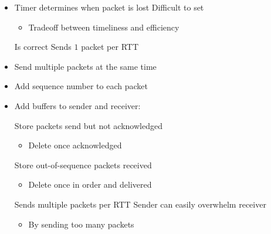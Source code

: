 \begin{itemize}
\begin{itemize}
\begin{verbatim}
\end{verbatim}
            \item Timer determines when packet is lost
             Difficult to set
                \begin{itemize}
                     Unnecessary retransmissions
                     Slow transmission
                        \begin{itemize}
                            \item Long wait for missing packets
                        \end{itemize}
                    \item Tradeoff between timeliness and efficiency
                \end{itemize}
            \ipro Is correct
            \icon Sends $1$ packet per RTT
        \end{itemize}
        \begin{itemize}
             Improve timeliness and efficiency
            \item Send multiple packets at the same time
            \item Add sequence number to each packet
            \item Add buffers to sender and receiver:
                \begin{itemize}
                     Store packets send but not acknowledged
                        \begin{itemize}
                            \item Delete once acknowledged
                        \end{itemize}
                     Store out-of-sequence packets received
                        \begin{itemize}
                            \item Delete once in order and delivered
                        \end{itemize}
                \end{itemize}
            \ipro Sends multiple packets per RTT
            \icon Sender can easily overwhelm receiver
                \begin{itemize}
                    \item By sending too many packets
                \end{itemize}
        \end{itemize}

\end{itemize}
